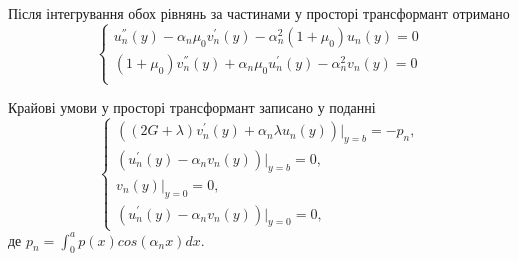 Після інтегрування обох рівнянь за частинами у просторі трансформант отримано
\begin{equation}\label{transf_static_1}
    \begin{cases}
        u_n^{''}(y) - \alpha_n \mu_0 v_n^{'}(y) - \alpha_n^2 (1 + \mu_0) u_n(y) = 0 \\
        (1 + \mu_0) v_n^{''}(y) + \alpha_n \mu_0 u_n^{'}(y)  - \alpha_n^2 v_n(y) = 0 \\
    \end{cases}
\end{equation}

Крайові умови у просторі трансформант записано у поданні
\begin{equation}\label{transf_bound_static_1}
    \begin{cases}
        \left( (2G + \lambda)v_n^{'}(y) + \alpha_n \lambda u_n(y) \right)|_{y=b} = -p_n, \\
        \left(u_n^{'}(y) - \alpha_n v_n(y)  \right)|_{y=b} = 0, \\
        v_n(y)|_{y=0} = 0, \\
        \left(u_n^{'}(y) - \alpha_n v_n(y)  \right)|_{y=0} = 0,
    \end{cases}
\end{equation}
де $p_n = \int_{0}^{a} p(x) cos(\alpha_n x) dx$.

